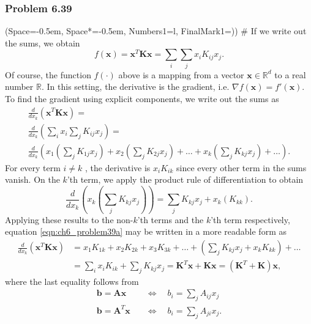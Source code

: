\documentclass[12pt, a4paper]{article}
\newcommand{\listSpace}{-0.5em}%
\newcommand{\R}{\mathbb{R}}
\newcommand{\vect}[1]{\bm{#1}}
\begin{document}
{\subsubsection*{Problem 6.39}
\begin{easylist}[enumerate]
	\ListProperties(Space=\listSpace, Space*=\listSpace, Numbers1=l, FinalMark1={)})
	# If we write out the sums, we obtain
	\begin{equation*}
		f(\vect{x}) = \vect{x}^T \vect{K} \vect{x} = \sum_i \sum_j x_i K_{ij} x_j.
	\end{equation*}
	Of course, the function $f(\cdot)$ above is a mapping from a vector $\vect{x} \in \R^d$ to a real number $\R$.
	In this setting, the derivative is the gradient, i.e. $\nabla f(\vect{x}) = f'(\vect{x})$.
	To find the gradient using explicit components, we write out the sums as
	\begin{gather}
		\nonumber \frac{d}{d x_k} \left( \vect{x}^T \vect{K} \vect{x} \right)  = \\ 
		\nonumber \frac{d}{d x_k} \left( \sum_i x_i \sum_j K_{ij} x_j \right)  = \\
		\label{eqn:ch6_problem39a} \frac{d}{d x_k} \left( 
		x_1 \left( \sum_j K_{1j} x_j \right) + 
		x_2 \left( \sum_j K_{2j} x_j \right) + \dots +
		x_k \left( \sum_j K_{kj} x_j \right) + \dots
		 \right).
	\end{gather}
	For every term $i \neq k$ , the derivative is $x_i K_{ik}$ since every other term in the sums vanish.
	On the $k$'th term, we apply the product rule of differentiation to obtain
	\begin{equation*}
		\frac{d}{d x_k} \left( x_k \left( \sum_j K_{kj} x_j \right) \right)=
		\sum_j K_{kj} x_j  +
		x_k \left( K_{kk} \right).
	\end{equation*}
	Applying these results to the non-$k$'th terms and the $k$'th term respectively, equation \eqref{eqn:ch6_problem39a} may be written in a more readable form as
	\begin{align*}
	\frac{d}{d x_k} \left( \vect{x}^T \vect{K} \vect{x} \right)  &=  x_1 K_{1k} + x_2 K_{2k} + x_3 K_{3k} + \dots + 
		\left(  \sum_j K_{kj} x_j  +
		x_k  K_{kk}  \right)
		+ \dots  \\
		& =  \sum_i x_i K_{ik} + \sum_j K_{kj} x_j = 
		\vect{K}^T \vect{x} + \vect{K} \vect{x} = 
		\left( \vect{K}^T + \vect{K}  \right)\vect{x},
	\end{align*}
	where the last equality follows from
	\begin{align*}
		\vect{b} = \vect{A} \vect{x} \quad &\Leftrightarrow \quad
		b_i = \sum_j A_{ij} x_j \\
		\vect{b} = \vect{A}^T \vect{x} \quad &\Leftrightarrow \quad
		b_i = \sum_j A_{ji} x_j.
	\end{align*}
	

\end{easylist}}
\end{document}
